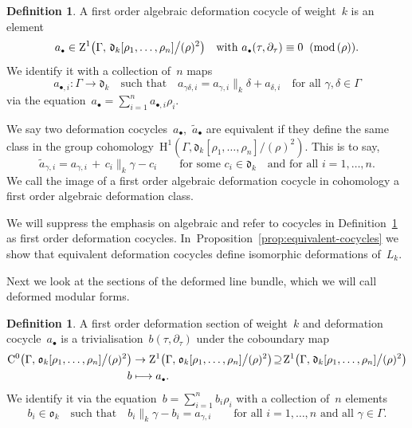 \documentclass[JEP,XML,SOM,Unicode,published]{cedram}
\newcommand\mto{\mathchoice{\longmapsto}{\mapsto}{\mapsto}{\mapsto}}
\let\oldbullet\bullet
\renewcommand{\bullet}{{\scriptscriptstyle\oldbullet}}
\theoremstyle{plain}
\theoremstyle{definition}
\newtheorem{definition}[theoremcounter]{Definition}
\newcommand{\tx}{\text}
\newcommand{\frakd}{\ensuremath{\mathfrak{d}}}
\newcommand{\frako}{\ensuremath{\mathfrak{o}}}
\newcommand{\rmC}{\ensuremath{\mathrm{C}}}
\newcommand{\rmH}{\ensuremath{\mathrm{H}}}
\newcommand{\rmZ}{\ensuremath{\mathrm{Z}}}
\newcommand{\defcol}{\mathrel{:}}
\renewcommand{\pmod}[1]{\;(\mathrm{mod}\, #1)}
\let\Ga\Gamma
\let\ga\gamma
\begin{document}
\begin{definition}
\label{def:first_order_deformation_cocycle}
A first order algebraic deformation cocycle of weight~$k$ is an element
\begin{equation*}
a_\bullet
\in
\rmZ^1\bigl(\Ga,\, \frakd_k[\rho_1, \ldots, \rho_n] \big\slash (\rho)^2 \bigr)
\quad\tx{with\ }
a_\bullet(\tau,\partial_\tau)
\equiv
0
\;\pmod{(\rho)}
\tx{.}
\end{equation*}
We identify it with a collection of~$n$ maps
\begin{equation*}
a_{\bullet,i} \defcol \Ga \to \frakd_k
\quad\tx{such that}\quad
a_{\ga\delta,i} = a_{\ga,i}\big\|_k \delta + a_{\delta,i}
\quad
\tx{for all\ }\ga, \delta \in \Ga
\end{equation*}
via the equation~$a_\bullet = \sum_{i=1}^n a_{\bullet,i} \rho_i$.

We say two deformation cocycles~$a_{\bullet}$,~$\tilde{a}_{\bullet}$ are equivalent if they define the same class in the group cohomology~$\rmH^1(\Ga, \frakd_k[\rho_1,\ldots,\rho_n] \slash (\rho)^2)$. This is to say,
\begin{equation*}
\tilde{a}_{\ga,i}
=
a_{\ga,i}
\,+\,
c_i\big\|_k\ga - c_i
\qquad
\tx{for some\ }
c_i\in\frakd_k
\quad
\tx{and for all~$i=1,\ldots,n$.}
\end{equation*}
We call the image of a first order algebraic deformation cocycle in cohomology a first order algebraic deformation class.
\end{definition}

We will suppress the emphasis on algebraic and refer to cocycles in Definition~\ref{def:first_order_deformation_cocycle} as first order deformation cocycles. In~Proposition~\ref{prop:equivalent-cocycles} we show that equivalent deformation cocycles define isomorphic deformations of\/~$L_k$.

Next we look at the sections of the deformed line bundle, which we will call deformed modular forms.

\begin{definition}
\label{def:first_order_deformation_section}
A first order deformation section of weight~$k$ and deformation cocycle~$a_{\bullet}$ is a trivialisation~$b(\tau,\partial_\tau)$ under the coboundary map
\begin{align*}
\rmC^0\bigl(\Ga,\mkern2mu \frako_k[\rho_1,\ldots,\rho_n] \big\slash (\rho)^2 \bigr)
&
\to{}
\rmZ^1\bigl(\Ga,\mkern2mu \frako_k[\rho_1,\ldots,\rho_n] \big\slash (\rho)^2 \bigr)
\!\supseteq\!
\rmZ^1\bigl(\Ga,\mkern2mu \frakd_k[\rho_1,\ldots,\rho_n] \big\slash (\rho)^2 \bigr)
\\
b
&\mto
a_\bullet
\tx{.}
\end{align*}
We identify it via the equation~$b = \sum_{i=1}^n b_i \rho_i$ with a collection of~$n$ elements
\begin{equation*}
b_i \in \frako_k
\quad\tx{such that}\quad
b_i\big\|_k\ga - b_i = a_{\ga,i}
\qquad
\tx{for all~$i=1,\ldots,n$ and all~$\ga\in\Ga$.}
\end{equation*}
\end{definition}
\end{document}
